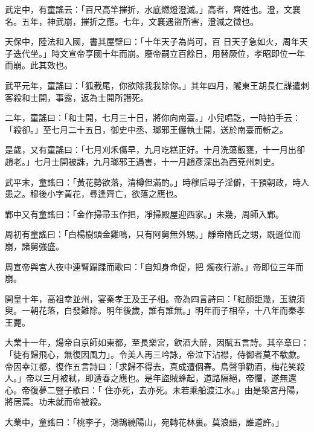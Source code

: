 \begin{pinyinscope}
 武定中，有童謠云：「百尺高竿摧折，水底燃燈澄滅。」高者，齊姓也。澄，文襄名。五年，神武崩，摧折之應。七年，文襄遇盜所害，澄滅之徵也。



 天保中，陸法和入國，書其屋壁曰：「十年天子為尚可，百
 日天子急如火，周年天子迭代坐。」時文宣帝享國十年而崩。廢帝嗣立百餘日，用替厥位，孝昭即位一年而崩。此其效也。



 武平元年，童謠曰：「狐截尾，你欲除我我除你。」其年四月，隴東王胡長仁謀遣刺客殺和士開，事露，返為士開所譖死。



 二年，童謠曰：「和士開，七月三十日，將你向南臺。」小兒唱訖，一時拍手云：「殺卻。」至七月二十五日，御史中丞、瑯邪王儼執士開，送於南臺而斬之。



 是歲，又有童謠曰：「七月刈禾傷早，九月吃糕正好。十月洗蕩飯甕，十一月出卻
 趙老。」七月士開被誅，九月瑯邪王遇害，十一月趙彥深出為西兗州刺史。



 武平末，童謠曰：「黃花勢欲落，清樽但滿酌。」時穆后母子淫僻，干預朝政，時人患之。穆後小字黃花，尋逢齊亡，欲落之應也。



 鄴中又有童謠曰：「金作掃帚玉作把，凈掃殿屋迎西家。」未幾，周師入鄴。



 周初有童謠曰：「白楊樹頭金雞鳴，只有阿舅無外甥。」靜帝隋氏之甥，既遜位而崩，諸舅強盛。



 周宣帝與宮人夜中連臂蹋蹀而歌曰：「自知身命促，把
 燭夜行游。」帝即位三年而崩。



 開皇十年，高祖幸並州，宴秦孝王及王子相。帝為四言詩曰：「紅顏詎幾，玉貌須臾。一朝花落，白發難除。明年後歲，誰有誰無。」明年而子相卒，十八年而秦孝王薨。



 大業十一年，煬帝自京師如東都，至長樂宮，飲酒大醉，因賦五言詩。其卒章曰：「徒有歸飛心，無復因風力」。令美人再三吟詠，帝泣下沾襟，侍御者莫不欷歔。帝因幸江都，復作五言詩曰：「求歸不得去，真成遭個春。鳥聲爭勸酒，梅花笑殺人。」帝以三月被弒，即遭春之應也。是年盜賊蜂起，道路隔絕，帝懼，遂無還心。帝復夢二豎子歌曰：「
 住亦死，去亦死。未若乘船渡江水。」由是築宮丹陽，將居焉。功未就而帝被殺。



 大業中，童謠曰：「桃李子，鴻鵠繞陽山，宛轉花林裏。莫浪語，誰道許。」




\end{pinyinscope}
